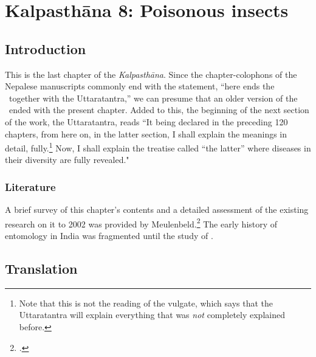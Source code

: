 \chapter{Kalpasthāna 8: Poisonous insects}

\section{Introduction} 

This is the last chapter of the \emph{Kalpasthāna}.  Since the
chapter-colophons of the Nepalese manuscripts commonly end with the
statement, “here ends the \SS\ together with the Uttaratantra,” we can
presume that an older version of the \SS\ ended with the present
chapter.  Added to this, the beginning of the next section of the
work, the Uttaratantra, reads “It being declared in the preceding 120
chapters, from here on, in the latter section, I shall explain the
meanings in detail, fully.\footnote{Note that this is not the reading
    of the vulgate, which says that the Uttaratantra will explain
    everything that was \emph{not} completely explained before.}  Now, I
    shall explain the treatise called “the latter” where diseases
    in their diversity are fully revealed."
    
    

\subsection{Literature} 
A brief survey of this chapter's contents and a detailed assessment of
the existing research on it to 2002 was provided by
Meulenbeld.\footcite[IA, 296--299]{meul-hist} The early history of entomology in 
India was fragmented until the study of \citep{maxw-1909}. 


\section{Translation}



